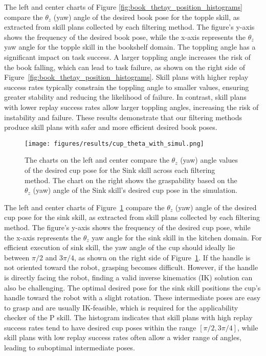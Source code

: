 The left and center charts of Figure \ref{fig:book_thetay_position_histograms} compare the $\theta_z$ (yaw) angle of the desired book pose for the topple skill, as extracted from skill plans collected by each filtering method. The figure's y-axis shows the frequency of the desired book pose, while the x-axis represents the $\theta_z$ yaw angle for the topple skill in the bookshelf domain.
The toppling angle has a significant impact on task success. A larger toppling angle increases the risk of the book falling, which can lead to task failure, as shown on the right side of Figure~\ref{fig:book_thetay_position_histograms}. Skill plans with higher replay success rates typically constrain the toppling angle to smaller values, ensuring greater stability and reducing the likelihood of failure. In contrast, skill plans with lower replay success rates allow larger toppling angles, increasing the risk of instability and failure. These results demonstrate that our filtering methods produce skill plans with safer and more efficient desired book poses.

\begin{figure}[h] %
\centering
\texttt{[image: figures/results/cup\_theta\_with\_simul.png]}
\caption{The charts on the left and center compare the \( \theta_z \) (yaw) angle values of the desired cup pose for the Sink skill across each filtering method. The chart on the right shows the graspability based on the \( \theta_z \) (yaw) angle of the Sink skill's desired cup pose in the simulation.
} %
\label{fig:cup_theta_position_histograms} %
\end{figure}

The left and center charts of Figure~\ref{fig:cup_theta_position_histograms} compare the $\theta_z$ (yaw) angle of the desired cup pose for the sink skill, as extracted from skill plans collected by each filtering method. The figure's y-axis shows the frequency of the desired cup pose, while the x-axis represents the $\theta_z$ yaw angle for the sink skill in the kitchen domain.
For efficient execution of sink skill, the yaw angle of the cup should ideally lie between \( \pi/2 \) and \( 3\pi/4 \), as shown on the right side of Figure~\ref{fig:cup_theta_position_histograms}. If the handle is not oriented toward the robot, grasping becomes difficult. However, if the handle is directly facing the robot, finding a valid inverse kinematics (IK) solution can also be challenging. The optimal desired pose for the sink skill positions the cup's handle toward the robot with a slight rotation. These intermediate poses are easy to grasp and are usually IK-feasible, which is required for the applicability checker of the P skill. The histogram indicates that skill plans with high replay success rates tend to have desired cup poses within the range \( [\pi/2, 3\pi/4] \), while skill plans with low replay success rates often allow a wider range of angles, leading to suboptimal intermediate poses.

